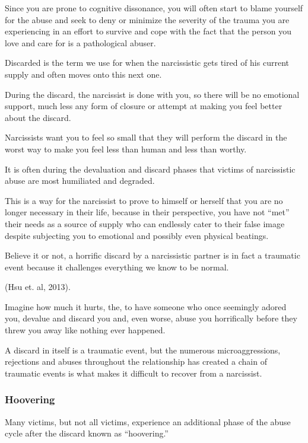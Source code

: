 \documentclass[oneside]{book}
\numberwithin{equation}{section}
\begin{document}
Since you are prone to cognitive dissonance, you will often start to blame yourself for the abuse and seek to deny or minimize the severity of the trauma you are experiencing in an effort to survive and cope with the fact that the person you love and care for is a pathological abuser.

%

Discarded is the term we use for when the narcissistic gets tired of his current supply and often moves onto this next one.

During the discard, the narcissist is done with you, so there will be no emotional support, much less any form of closure or attempt at making you feel better about the discard.

Narcissists want you to feel so small that they will perform the discard in the worst way to make you feel less than human and less than worthy.

It is often during the devaluation and discard phases that victims of narcissistic abuse are most humiliated and degraded.

This is a way for the narcissist to prove to himself or herself that you are no longer necessary in their life, because in their perspective, you have not ``met'' their needs as a source of supply who can endlessly cater to their false image despite subjecting you to emotional and possibly even physical beatings.

Believe it or not, a horrific discard by a narcissistic partner is in fact a traumatic event because it challenges everything we know to be normal.

 (Hsu et. al, 2013).


Imagine how much it hurts, the, to have someone who once seemingly adored you, devalue and discard you and, even worse, abuse you horrifically before they threw you away like nothing ever happened.

A discard in itself is a traumatic event, but the numerous microaggressions, rejections and abuses throughout the relationship has created a chain of traumatic events is what makes it difficult to recover from a narcissist.

\subsubsection{Hoovering}
Many victims, but not all victims, experience an additional phase of the abuse cycle after the discard known as ``hoovering.''
\end{document}
